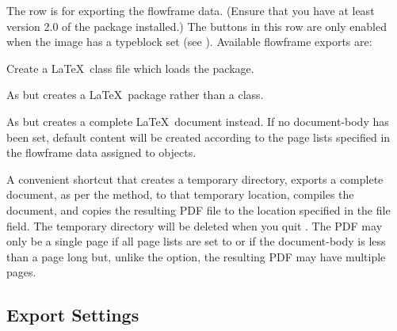 
The  row is for exporting the
\gls{flowframe} data. (Ensure that you have at least version 2.0 of
the  package installed.) The buttons in this row are only enabled when
the image has a \gls{typeblock} set
(see ). Available \gls{flowframe}
exports are:
\begin{deflist}

\begin{itemdesc}
Create a \LaTeX\ class file which loads the  package.
\end{itemdesc}


\begin{itemdesc}
As  but creates a \LaTeX\ package rather than a
class.
\end{itemdesc}


\begin{itemdesc}
As  but creates a complete \LaTeX\ document instead.
If no \gls{document-body} has been set, default content will be
created according to the page lists specified in the \gls{flowframe}
data assigned to \glspl{object}.
\end{itemdesc}


\begin{itemdesc}
A convenient shortcut that creates a temporary directory, 
exports a complete document, as per the  method, to that
temporary location, compiles the document, and copies the resulting
PDF file to the location specified in the file field. The temporary
directory will be deleted when you quit \FlowframTk.
The PDF may only be a single page if all page lists are set to
 or if the \gls{document-body} is less than a page long but, 
unlike the  option,
the resulting PDF may have multiple pages.
\end{itemdesc}
\end{deflist}

\subsection{Export Settings}\label{sec:exportsettings}

